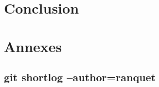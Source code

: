 \documentclass[a4paper,11pt,twoside,final]{article}
\begin{document}
  \cleardoublepage

  \section{Conclusion}

  \cleardoublepage
  \section{Annexes}

  \subsection{git shortlog --author=ranquet}
  \begin{adjustwidth}{-2cm}{-2cm}
  \end{adjustwidth}

  \cleardoublepage
  \cleardoublepage
\end{document}
